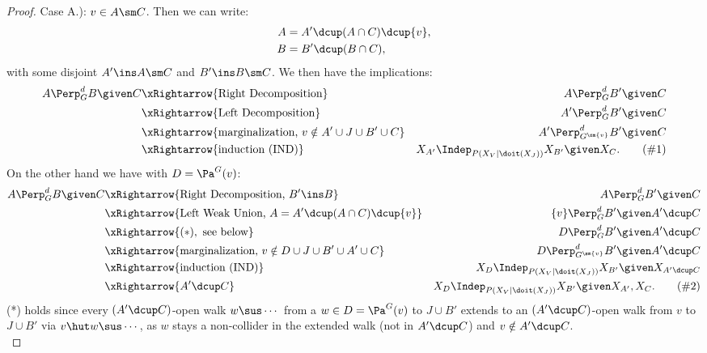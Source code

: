\begin{Thm}
\begin{proof}
Case A.):  $v \in A\sm C$. Then we can write:
\begin{align*}
    A &= A' \dcup (A \cap C) \dcup \{v\}, \\
    B &= B' \dcup (B \cap C),
\end{align*}
with some disjoint $A' \ins A \sm C$ and $B' \ins B \sm C$.
We then have the implications:
\begin{align*}
    A \Perp^d_G  B \given C & \xRightarrow{\text{Right Decomposition}}  & A \Perp^d_G B' \given C \\
    & \xRightarrow{\text{Left Decomposition}}  & A' \Perp^d_G  B' \given C \\
    & \xRightarrow{\text{marginalization, } v \notin A'\cup J \cup B' \cup C}  & A' \Perp^d_{G^{\sm \{v\}}}  B' \given C \\
 & \xRightarrow{\text{induction (IND)}}  & X_{A'} \Indep_{P(X_V|\doit(X_J))}  X_{B'} \given X_C. \label{eqn:bli} \tag{\#1}\\
\end{align*}
On the other hand we have with $D = \Pa^G(v)$:
\begin{align*}
 A \Perp^d_G  B \given C & \xRightarrow{\text{Right Decomposition, }B' \ins B}  & A \Perp^d_G   B' \given C   \\
  & \xRightarrow{\text{Left Weak Union, } A= A' \dcup (A \cap C) \dcup \{v\}}  & \{v\} \Perp^d_G  B' \given A' \dcup C    \\
 & \xRightarrow{(*), \text{ see below}}  & D  \Perp^d_G   B' \given A' \dcup C \\ 
 & \xRightarrow{\text{marginalization, } v \notin D \cup J \cup B' \cup A' \cup C}  & D \Perp^d_{G^{\sm \{v\}}}  B' \given A' \dcup C \\
& \xRightarrow{\text{induction (IND)}}  &   X_D  \Indep_{P(X_V|\doit(X_J))}  X_{B'} \given X_{A' \dcup C}\\
& \xRightarrow{A'\dcup C}  &   X_D  \Indep_{P(X_V|\doit(X_J))}  X_{B'} \given X_{A'}, X_C. \label{eqn:bla} \tag{\#2}
\end{align*}
(*) holds since every $(A' \dcup C)$-open walk $ w \sus \cdots$ from a  $w \in D=\Pa^G(v)$ to $J \cup B'$ 
extends to an $(A' \dcup C)$-open walk from $v$ to $J \cup B'$ via  $v \hut w \sus \cdots$, as $w$ stays a 
non-collider in the extended walk (not in $A' \dcup C$) and $v \notin A' \dcup C$.\\


\end{proof}
\end{Thm}
